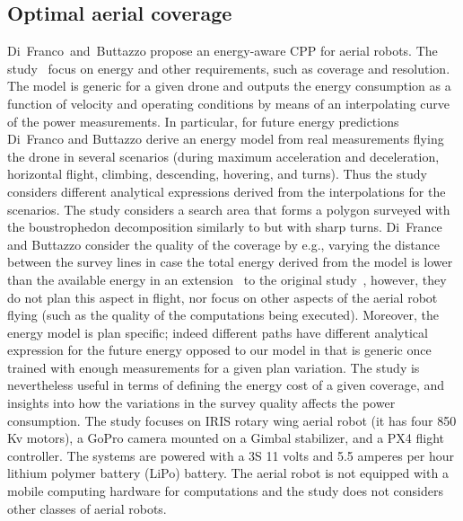 \subsection{Optimal aerial coverage}
\label{sec:opti-aero-cov}

Di~Franco~and~Buttazzo propose an energy-aware CPP for aerial robots. The study~\citep{difranco2015energy} focus on energy and other requirements, such as coverage and resolution.  The model is generic for a given drone and outputs the energy consumption as a function of velocity and operating conditions by means of an interpolating curve of the power measurements. In particular, for future energy predictions Di~Franco and Buttazzo derive an energy model from real measurements flying the drone in several scenarios (during maximum acceleration and deceleration, horizontal flight, climbing, descending, hovering, and turns). Thus the study considers different analytical expressions derived from the interpolations for the scenarios. The study considers a search area that forms a polygon surveyed with the boustrophedon decomposition similarly to  but with sharp turns. Di~France and Buttazzo consider the quality of the coverage by e.g., varying the distance between the survey lines in case the total energy derived from the model is lower than the available energy in an extension~\citep{difranco2016coverage} to the original study~\citep{difranco2015energy}, however, they do not plan this aspect in flight, nor focus on other aspects of the aerial robot flying (such as the quality of the computations being executed). Moreover, the energy model is plan specific; indeed different paths have different analytical expression for the future energy opposed to our model in  that is generic once trained with enough measurements for a given plan variation. The study is nevertheless useful in terms of defining the energy cost of a given coverage, and insights into how the variations in the survey quality affects the power consumption. The study focuses on IRIS rotary wing aerial robot (it has four 850 Kv motors), a GoPro camera mounted on a Gimbal stabilizer, and a PX4 flight controller. The systems are powered with a 3S 11 volts and 5.5 amperes per hour  lithium polymer battery (LiPo) battery. The aerial robot is not equipped with a mobile computing hardware for computations and the study does not considers other classes of aerial robots. 

